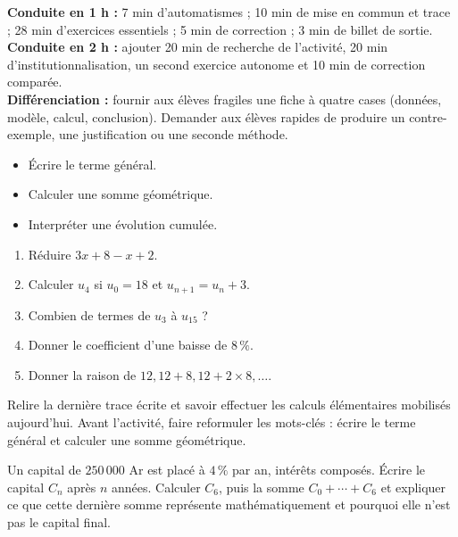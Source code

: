     \ifprof
    \begin{methode}
    \textbf{Conduite en 1 h :} 7 min d'automatismes ; 10 min de mise en commun et trace ; 28 min d'exercices essentiels ; 5 min de correction ; 3 min de billet de sortie.\\
    \textbf{Conduite en 2 h :} ajouter 20 min de recherche de l'activité, 20 min d'institutionnalisation, un second exercice autonome et 10 min de correction comparée.\\
    \textbf{Différenciation :} fournir aux élèves fragiles une fiche à quatre cases (données, modèle, calcul, conclusion). Demander aux élèves rapides de produire un contre-exemple, une justification ou une seconde méthode.
    \end{methode}
    \fi
{}
\begin{objectifs}\begin{itemize}\item Écrire le terme général.\item Calculer une somme géométrique.\item Interpréter une évolution cumulée.\end{itemize}\end{objectifs}
\begin{automatismes}\begin{enumerate}\item Réduire $3x+8-x+2$. \item Calculer $u_4$ si $u_0=18$ et $u_{n+1}=u_n+3$. \item Combien de termes de $u_3$ à $u_{15}$ ? \item Donner le coefficient d'une baisse de $8\,\%$. \item Donner la raison de $12,12+8,12+2\times8,\ldots$. \end{enumerate}\end{automatismes}
\begin{prerequis}Relire la dernière trace écrite et savoir effectuer les calculs élémentaires mobilisés aujourd'hui. Avant l'activité, faire reformuler les mots-clés : écrire le terme général et calculer une somme géométrique.\end{prerequis}

\begin{activite}
Un capital de $250\,000$ Ar est placé à $4\,\%$ par an, intérêts composés. Écrire le capital $C_n$ après $n$ années. Calculer $C_6$, puis la somme $C_0+\cdots+C_6$ et expliquer ce que cette dernière somme représente mathématiquement et pourquoi elle n'est pas le capital final.

\end{activite}


